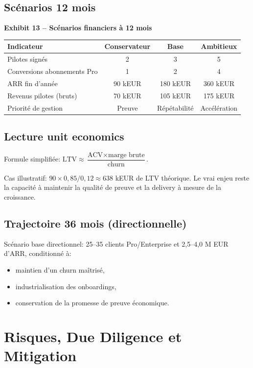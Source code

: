 \documentclass[11pt,a4paper]{article}
\newcommand{\exhibit}[1]{\vspace{2mm}\noindent\colorbox{PraedixaLight}{\parbox{\dimexpr\linewidth-2\fboxsep\relax}{\textbf{#1}}}\vspace{1mm}}
\begin{document}
\subsection{Scénarios 12 mois}
\exhibit{Exhibit 13 -- Scénarios financiers à 12 mois}
\begin{tabularx}{\linewidth}{@{}l c c c@{}}
\toprule
\textbf{Indicateur} & \textbf{Conservateur} & \textbf{Base} & \textbf{Ambitieux} \\
\midrule
Pilotes signés & 2 & 3 & 5 \\
Conversions abonnements Pro & 1 & 2 & 4 \\
ARR fin d'année & 90 kEUR & 180 kEUR & 360 kEUR \\
Revenus pilotes (bruts) & 70 kEUR & 105 kEUR & 175 kEUR \\
Priorité de gestion & Preuve & Répétabilité & Accélération \\
\bottomrule
\end{tabularx}

\subsection{Lecture unit economics}
Formule simplifiée: $\text{LTV} \approx \dfrac{\text{ACV} \times \text{marge brute}}{\text{churn}}$.

Cas illustratif: $90 \times 0{,}85 / 0{,}12 \approx 638$ kEUR de LTV théorique. Le vrai enjeu reste la capacité à maintenir la qualité de preuve et la delivery à mesure de la croissance.

\subsection{Trajectoire 36 mois (directionnelle)}
Scénario base directionnel: 25--35 clients Pro/Enterprise et 2,5--4,0 M EUR d'ARR, conditionné à:
\begin{itemize}
  \item maintien d'un churn maîtrisé,
  \item industrialisation des onboardings,
  \item conservation de la promesse de preuve économique.
\end{itemize}

\section{Risques, Due Diligence et Mitigation}
\end{document}
